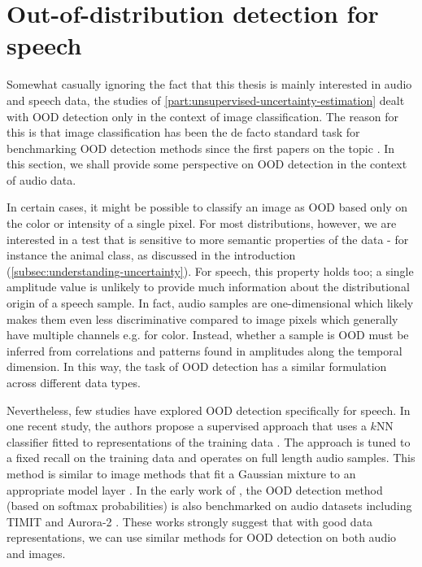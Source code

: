 \section{Out-of-distribution detection for speech}\label{sec_discussion:out-of-distribution-detection-for-speech}
%
%
Somewhat casually ignoring the fact that this thesis is mainly interested in audio and speech data, the studies of \cref{part:unsupervised-uncertainty-estimation} dealt with OOD detection only in the context of image classification. The reason for this is that image classification has been the de facto standard task for benchmarking OOD detection methods since the first papers on the topic \parencite{choi_waic_2019,nalisnick_detecting_2019,hendrycks_deep_2019,kirichenko_why_2020}. 
In this section, we shall provide some perspective on OOD detection in the context of audio data. 

In certain cases, it might be possible to classify an image as OOD based only on the color or intensity of a single pixel. 
For most distributions, however, we are interested in a test that is sensitive to more semantic properties of the data - for instance the animal class, as discussed in the introduction (\cref{subsec:understanding-uncertainty}). 
For speech, this property holds too; a single amplitude value is unlikely to provide much information about the distributional origin of a speech sample. In fact, audio samples are one-dimensional which likely makes them even less discriminative compared to image pixels which generally have multiple channels e.g. for color. Instead, whether a sample is OOD must be inferred from correlations and patterns found in amplitudes along the temporal dimension. In this way, the task of OOD detection has a similar formulation across different data types. 

Nevertheless, few studies have explored OOD detection specifically for speech. 
In one recent study, the authors propose a supervised approach that uses a $k$NN classifier fitted to representations of the training data \parencite{bukhsh_outofdistribution_2023}. The approach is tuned to a fixed recall on the training data and operates on full length audio samples. This method is similar to image methods that fit a Gaussian mixture to an appropriate model layer \parencite{lee_simple_2018, xiao_we_2021}. In the early work of \textcite{hendrycks_baseline_2017}, the OOD detection method (based on softmax probabilities) is also benchmarked on audio datasets including TIMIT and Aurora-2 \parencite{garofolo_timit_1993,pearce_aurora_2000}. These works strongly suggest that with good data representations, we can use similar methods for OOD detection on both audio and images.

